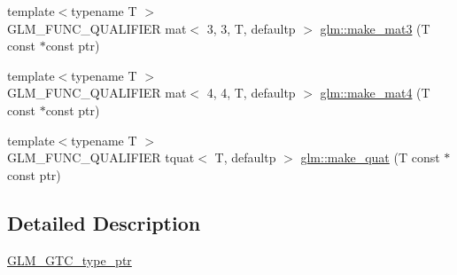 \begin{DoxyCompactItemize}
\item 
{\footnotesize template$<$typename T $>$ }\\G\+L\+M\+\_\+\+F\+U\+N\+C\+\_\+\+Q\+U\+A\+L\+I\+F\+I\+ER mat$<$ 3, 3, T, defaultp $>$ \hyperlink{group__gtc__type__ptr_ga611ee7c4d4cadfc83a8fa8e1d10a170f}{glm\+::make\+\_\+mat3} (T const $\ast$const ptr)
\item 
{\footnotesize template$<$typename T $>$ }\\G\+L\+M\+\_\+\+F\+U\+N\+C\+\_\+\+Q\+U\+A\+L\+I\+F\+I\+ER mat$<$ 4, 4, T, defaultp $>$ \hyperlink{group__gtc__type__ptr_gae7bcedb710d1446c87fd1fc93ed8ee9a}{glm\+::make\+\_\+mat4} (T const $\ast$const ptr)
\item 
{\footnotesize template$<$typename T $>$ }\\G\+L\+M\+\_\+\+F\+U\+N\+C\+\_\+\+Q\+U\+A\+L\+I\+F\+I\+ER tquat$<$ T, defaultp $>$ \hyperlink{group__gtc__type__ptr_gaadafb6600af2633e4c98cc64c72f5269}{glm\+::make\+\_\+quat} (T const $\ast$const ptr)
\end{DoxyCompactItemize}


\subsection{Detailed Description}
\hyperlink{group__gtc__type__ptr}{G\+L\+M\+\_\+\+G\+T\+C\+\_\+type\+\_\+ptr} 